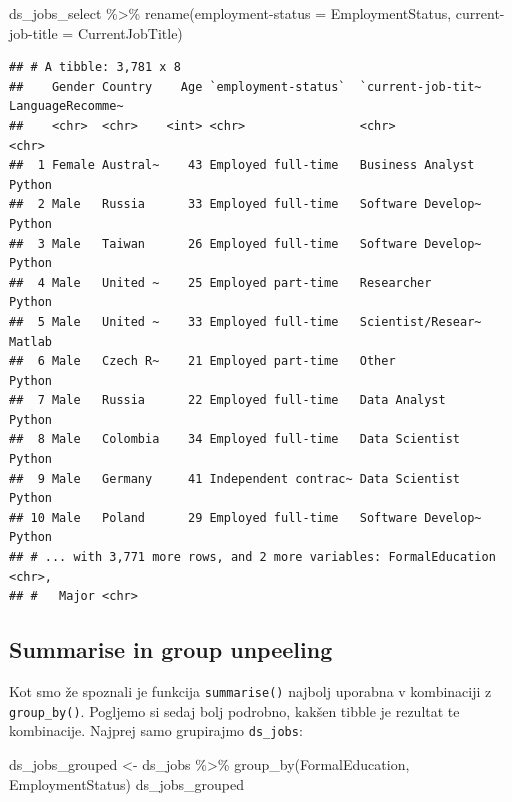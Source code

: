 \documentclass[
]{book}
\newenvironment{Shaded}{\begin{snugshade}}{\end{snugshade}}
\newcommand{\AttributeTok}[1]{\textcolor[rgb]{0.77,0.63,0.00}{#1}}
\newcommand{\FunctionTok}[1]{\textcolor[rgb]{0.00,0.00,0.00}{#1}}
\newcommand{\NormalTok}[1]{#1}
\newcommand{\OtherTok}[1]{\textcolor[rgb]{0.56,0.35,0.01}{#1}}
\newcommand{\SpecialCharTok}[1]{\textcolor[rgb]{0.00,0.00,0.00}{#1}}
\newcommand{\StringTok}[1]{\textcolor[rgb]{0.31,0.60,0.02}{#1}}
\begin{document}
\begin{Shaded}
\begin{Highlighting}[]
\NormalTok{ds\_jobs\_select }\SpecialCharTok{\%\textgreater{}\%}
  \FunctionTok{rename}\NormalTok{(}\StringTok{\textasciigrave{}}\AttributeTok{employment{-}status}\StringTok{\textasciigrave{}} \OtherTok{=}\NormalTok{ EmploymentStatus,}
         \StringTok{\textasciigrave{}}\AttributeTok{current{-}job{-}title}\StringTok{\textasciigrave{}} \OtherTok{=}\NormalTok{ CurrentJobTitle)}
\end{Highlighting}
\end{Shaded}

\begin{verbatim}
## # A tibble: 3,781 x 8
##    Gender Country    Age `employment-status`  `current-job-tit~ LanguageRecomme~
##    <chr>  <chr>    <int> <chr>                <chr>             <chr>           
##  1 Female Austral~    43 Employed full-time   Business Analyst  Python          
##  2 Male   Russia      33 Employed full-time   Software Develop~ Python          
##  3 Male   Taiwan      26 Employed full-time   Software Develop~ Python          
##  4 Male   United ~    25 Employed part-time   Researcher        Python          
##  5 Male   United ~    33 Employed full-time   Scientist/Resear~ Matlab          
##  6 Male   Czech R~    21 Employed part-time   Other             Python          
##  7 Male   Russia      22 Employed full-time   Data Analyst      Python          
##  8 Male   Colombia    34 Employed full-time   Data Scientist    Python          
##  9 Male   Germany     41 Independent contrac~ Data Scientist    Python          
## 10 Male   Poland      29 Employed full-time   Software Develop~ Python          
## # ... with 3,771 more rows, and 2 more variables: FormalEducation <chr>,
## #   Major <chr>
\end{verbatim}

\hypertarget{summarise-in-group-unpeeling}{%
\subsection{Summarise in group unpeeling}\label{summarise-in-group-unpeeling}}

Kot smo že spoznali je funkcija \texttt{summarise()} najbolj uporabna v kombinaciji z \texttt{group\_by()}. Pogljemo si sedaj bolj podrobno, kakšen tibble je rezultat te kombinacije. Najprej samo grupirajmo \texttt{ds\_jobs}:

\begin{Shaded}
\begin{Highlighting}[]
\NormalTok{ds\_jobs\_grouped }\OtherTok{\textless{}{-}}\NormalTok{ ds\_jobs }\SpecialCharTok{\%\textgreater{}\%}
  \FunctionTok{group\_by}\NormalTok{(FormalEducation, EmploymentStatus)}
\NormalTok{ds\_jobs\_grouped}
\end{Highlighting}
\end{Shaded}
\end{document}
